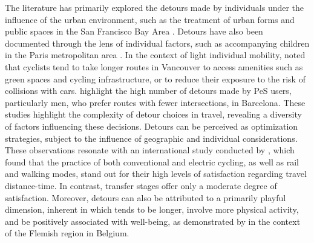 \begin{refsegment}
The literature has primarily explored the detours made by individuals under the influence of the urban environment, such as the treatment of urban forms and public spaces in the San Francisco Bay Area \textcolor{blue}{\autocite[210]{cervero_travel_1997}}. Detours have also been documented through the lens of individual factors, such as accompanying children in the Paris metropolitan area \textcolor{blue}{\autocite[149]{motte-baumvol_who_2017}}. In the context of light individual mobility, \textcolor{blue}{\textcite[4]{winters_how_2010}} noted that cyclists tend to take longer routes in Vancouver to access amenities such as green spaces and cycling infrastructure, or to reduce their exposure to the risk of collisions with cars. \textcolor{blue}{\textcite[6]{cubells_e-scooter_2023}} highlight the high number of detours made by \acrshort{PeS} users, particularly men, who prefer routes with fewer intersections, in Barcelona. These studies highlight the complexity of detour choices in travel, revealing a diversity of factors influencing these decisions. Detours can be perceived as optimization strategies, subject to the influence of geographic and individual considerations. These observations resonate with an international study conducted by \textcolor{blue}{\textcite[591]{cornet_worthwhile_2022}}, which found that the practice of both conventional and electric cycling, as well as rail and walking modes, stand out for their high levels of satisfaction regarding travel distance-time. In contrast, transfer stages offer only a moderate degree of satisfaction. Moreover, detours can also be attributed to a primarily playful dimension, inherent in  which tends to be longer, involve more physical activity, and be positively associated with well-being, as demonstrated by \textcolor{blue}{\textcite[8-9]{hook_undirected_2021}} in the context of the Flemish region in Belgium.%


\end{refsegment}
